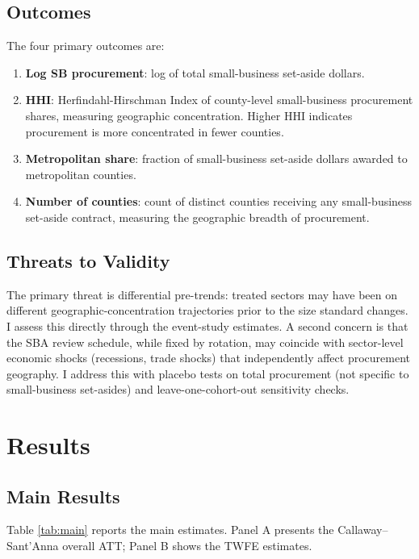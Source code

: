 \documentclass[12pt]{article}
\begin{document}
\subsection{Outcomes}

The four primary outcomes are:
\begin{enumerate}
  \item \textbf{Log SB procurement}: log of total small-business set-aside dollars.
  \item \textbf{HHI}: Herfindahl-Hirschman Index of county-level small-business procurement shares, measuring geographic concentration. Higher HHI indicates procurement is more concentrated in fewer counties.
  \item \textbf{Metropolitan share}: fraction of small-business set-aside dollars awarded to metropolitan counties.
  \item \textbf{Number of counties}: count of distinct counties receiving any small-business set-aside contract, measuring the geographic breadth of procurement.
\end{enumerate}

\subsection{Threats to Validity}

The primary threat is differential pre-trends: treated sectors may have been on different geographic-concentration trajectories prior to the size standard changes. I assess this directly through the \citet{callaway2021} event-study estimates. A second concern is that the SBA review schedule, while fixed by rotation, may coincide with sector-level economic shocks (recessions, trade shocks) that independently affect procurement geography. I address this with placebo tests on total procurement (not specific to small-business set-asides) and leave-one-cohort-out sensitivity checks.

\section{Results}

\subsection{Main Results}



Table \ref{tab:main} reports the main estimates. Panel A presents the Callaway--Sant'Anna overall ATT; Panel B shows the TWFE estimates.
\end{document}

